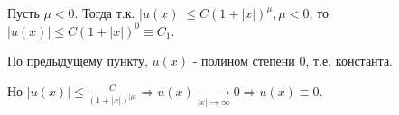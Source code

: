 
Пусть $\mu<0$. Тогда т.к. $|u(x)|\le C(1+|x|)^\mu, \mu<0$, то
$|u(x)| \le C (1+|x|)^0 \equiv C_1$. 

По предыдущему пункту, $u(x)$ - полином степени 0, т.е. константа.

Но $|u(x)| \le \frac{C}{(1+|x|)^{|\mu|}} \Rightarrow u(x) 
\underset{|x| \to \infty}{\longrightarrow}
0   \Rightarrow u(x) \equiv 0$.
 
